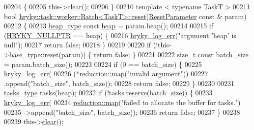 \begin{DoxyCode}
00204 \{
00205     this->\hyperlink{namespacehryky_aa201297ea9530da954a7230be71cc19d}{clear}();
00206 \}
00210 \textcolor{keyword}{template} < \textcolor{keyword}{typename} TaskT >
\hypertarget{task__worker__batch_8h_source_l00211}{}\hyperlink{group__task_ga88b1f6b27be23acb9fd42203d7cd3933}{00211} \textcolor{keywordtype}{bool} \hyperlink{classhryky_1_1task_1_1worker_1_1_batch}{hryky::task::worker::Batch<TaskT>::reset}(\hyperlink{structhryky_1_1task_1_1worker_1_1_base_1_1_reset_parameter}{ResetParameter} \textcolor{keyword}{const} & param)
00212 \{
00213     \hyperlink{classhryky_1_1memory_1_1heap_1_1_base}{heap_type} \textcolor{keyword}{const} \hyperlink{namespacehryky_1_1memory_1_1global_a6fc6103f67c837aa0f39b359588409cd}{heap} = param.heap();
00214 
00215     \textcolor{keywordflow}{if} (\hyperlink{common_8h_a4cd4ac09cfcdbd6b30ee69afc156e210}{HRYKY_NULLPTR} == heap) \{
00216         \hyperlink{log__writer__common_8h_ae5ad3dabb33f594695ef40753cb78aad}{hryky_log_err}(\textcolor{stringliteral}{"argument 'heap' is null"});
00217         \textcolor{keywordflow}{return} \textcolor{keyword}{false};
00218     \}
00219     
00220     \textcolor{keywordflow}{if} (!this->base\_type::reset(param)) \{ \textcolor{keywordflow}{return} \textcolor{keyword}{false}; \}
00221 
00222     \textcolor{keywordtype}{size\_t} \textcolor{keyword}{const} batch\_size = param.batch\_size();
00223 
00224     \textcolor{keywordflow}{if} (0 == batch\_size) \{
00225         \hyperlink{log__writer__common_8h_ae5ad3dabb33f594695ef40753cb78aad}{hryky_log_err}(
00226             (*\hyperlink{namespacehryky_1_1reduction_ac5eae270cf8047b294dc4ff3e5e11a79}{reduction::map}(\textcolor{stringliteral}{"invalid argument"}))
00227             .append(\textcolor{stringliteral}{"batch\_size"}, batch\_size));
00228         \textcolor{keywordflow}{return} \textcolor{keyword}{false};
00229     \}
00230 
00231     \hyperlink{classhryky_1_1_vector}{tasks_type} tasks(heap);
00232     \textcolor{keywordflow}{if} (!tasks.\hyperlink{classhryky_1_1_vector_a4d2a2874dcc88826b45782d4b1b73051}{reserve}(batch\_size)) \{
00233         \hyperlink{log__writer__common_8h_ae5ad3dabb33f594695ef40753cb78aad}{hryky_log_err}(
00234             \hyperlink{namespacehryky_1_1reduction_ac5eae270cf8047b294dc4ff3e5e11a79}{reduction::map}(\textcolor{stringliteral}{"failed to allocate the buffer for tasks."})
00235             ->append(\textcolor{stringliteral}{"batch\_size"}, batch\_size));
00236         \textcolor{keywordflow}{return} \textcolor{keyword}{false};
00237     \}
00238 
00239     this->\hyperlink{namespacehryky_aa201297ea9530da954a7230be71cc19d}{clear}();

\end{DoxyCode}
